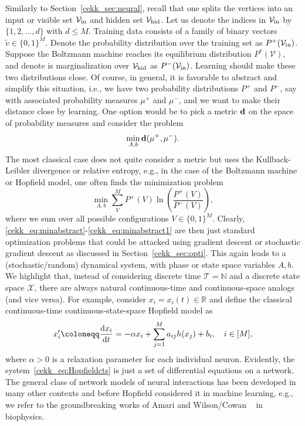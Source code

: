 \documentclass[10pt]{article}
\newcommand{\R}{{\mathbb R}}
\newcommand{\N}{{\mathbb N}}
\def\R{\mathbb{R}}
\def\N{\mathbb{N}}
\def\cT{\mathcal{T}}
\def\cV{\mathcal{V}}
\def\cX{\mathcal{X}}
\def\txtd{{\textnormal{d}}}
\newcommand{\be}{\begin{equation}}
\newcommand{\ee}{\end{equation}}
\begin{document}
Similarly to Section~\ref{cekk_sec:neural}, recall that one splits the vertices into an input or visible set $\cV_{\textnormal{in}}$ and hidden set $\cV_{\textnormal{hid}}$. Let us denote the indices in $\cV_{\textnormal{in}}$ by $\{1,2,\ldots,d\}$ with $d\leq M$. Training data consists of a family of binary vectors $\tilde{v}\in\{0,1\}^M$. Denote the probability distribution over the training set as $P^+(\cV_{\textnormal{in}})$. Suppose the Boltzmann machine reaches its equilibrium distribution $P^*(\cV)$, and denote is marginalization over $\cV_{\textnormal{hid}}$ as $P^-(\cV_{\textnormal{in}})$. Learning should make these two distributions close. Of course, in general, it is favorable to abstract and simplify this situation, i.e., we have two probability distributions $P^+$ and $P^-$, say with associated probability measures $\mu^+$ and $\mu^-$, and we want to make their distance close by learning. One option would be to pick a metric ${\bf d}$ on the space of probability measures and consider the problem
\be
\label{cekk_eq:minabstract}
\min_{A,b} {\bf d}(\mu^+,\mu^-).
\ee  
The most classical case does not quite consider a metric but uses the Kullback-Leibler divergence or relative entropy, e.g., in the case of the Boltzmann machine or Hopfield model, one often finds the minimization problem 
\be
\label{cekk_eq:minabstract1}
\min_{A,b} \sum_{V}^M P^+(V) \ln \left(\frac{P^+(V)}{P^-(V)}\right),
\ee
where we sum over all possible configurations $V\in\{0,1\}^M$. Clearly, \eqref{cekk_eq:minabstract}-\eqref{cekk_eq:minabstract1} are then just standard optimization problems that could be attacked using gradient descent or stochastic gradient descent as discussed in Section~\ref{cekk_sec:opti}. This again leads to a (stochastic/random) dynamical system, with phase or state space variables $A,b$. We highlight that, instead of considering discrete time $\cT=\N$ and a discrete state space $\cX$, there are always natural continuous-time and continuous-space analogs (and vice versa). For example, consider $x_i=x_i(t)\in\R$ and define the classical continuous-time continuous-state-space Hopfield model as 
\be
\label{cekk_eq:Hopfieldcts}
x_i'\coloneqq\frac{\txtd x_i}{\txtd t}=-\alpha x_i+\sum_{j=1}^Ma_{ij}h(x_j) + b_i,\quad i\in[M],
\ee
where $\alpha>0$ is a relaxation parameter for each individual neuron. Evidently, the system~\eqref{cekk_eq:Hopfieldcts} is just a set of differential equations on a network. The general class of network models of neural interactions has been developed in many other contexts and before Hopfield considered it in machine learning, e.g., we refer to the groundbreaking works of Amari and Wilson/Cowan ~\cite{Amari2,Amari3,WilsonCowan1,WilsonCowan} in biophysics. 
\end{document}
